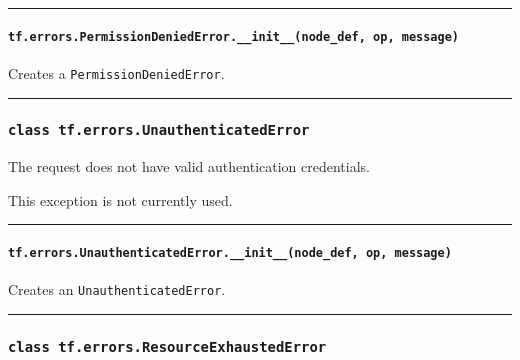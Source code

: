 \begin{center}\rule{0.5\linewidth}{\linethickness}\end{center}

\paragraph{\texorpdfstring{\texttt{tf.errors.PermissionDeniedError.\_\_init\_\_(node\_def,\ op,\ message)}
}{tf.errors.PermissionDeniedError.\_\_init\_\_(node\_def, op, message) }}\label{tf.errors.permissiondeniederror.ux5fux5finitux5fux5fnodeux5fdef-op-message}

Creates a \texttt{PermissionDeniedError}.

\begin{center}\rule{0.5\linewidth}{\linethickness}\end{center}

\subsubsection{\texorpdfstring{\texttt{class\ tf.errors.UnauthenticatedError}
}{class tf.errors.UnauthenticatedError }}\label{class-tf.errors.unauthenticatederror}

The request does not have valid authentication credentials.

This exception is not currently used.

\begin{center}\rule{0.5\linewidth}{\linethickness}\end{center}

\paragraph{\texorpdfstring{\texttt{tf.errors.UnauthenticatedError.\_\_init\_\_(node\_def,\ op,\ message)}
}{tf.errors.UnauthenticatedError.\_\_init\_\_(node\_def, op, message) }}\label{tf.errors.unauthenticatederror.ux5fux5finitux5fux5fnodeux5fdef-op-message}

Creates an \texttt{UnauthenticatedError}.

\begin{center}\rule{0.5\linewidth}{\linethickness}\end{center}

\subsubsection{\texorpdfstring{\texttt{class\ tf.errors.ResourceExhaustedError}
}{class tf.errors.ResourceExhaustedError }}\label{class-tf.errors.resourceexhaustederror}

